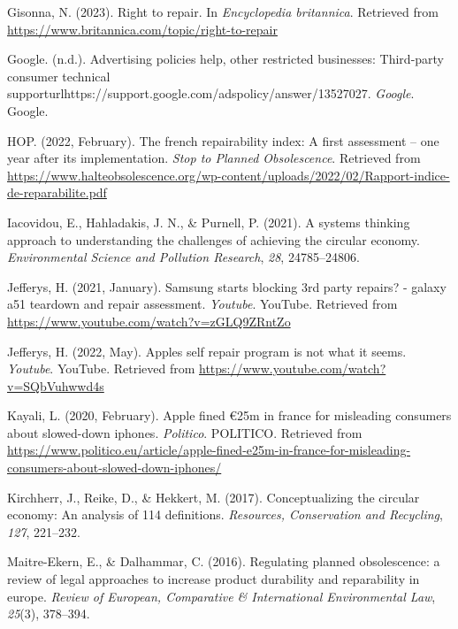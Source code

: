 \documentclass[11pt]{article}
\begin{document}
\begin{hangparas}{1.5em}{1}
\hypertarget{citeproc_bib_item_9}{Gisonna, N. (2023). Right to repair. In \textit{Encyclopedia britannica}. Retrieved from \url{https://www.britannica.com/topic/right-to-repair}}

\hypertarget{citeproc_bib_item_10}{Google. (n.d.). Advertising policies help, other restricted businesses: Third-party consumer technical supporturlhttps://support.google.com/adspolicy/answer/13527027. \textit{Google}. Google.}

\hypertarget{citeproc_bib_item_11}{HOP. (2022, February). The french repairability index: A first assessment – one year after its implementation. \textit{Stop to Planned Obsolescence}. Retrieved from \url{https://www.halteobsolescence.org/wp-content/uploads/2022/02/Rapport-indice-de-reparabilite.pdf}}

\hypertarget{citeproc_bib_item_12}{Iacovidou, E., Hahladakis, J. N., \& Purnell, P. (2021). A systems thinking approach to understanding the challenges of achieving the circular economy. \textit{Environmental Science and Pollution Research}, \textit{28}, 24785–24806.}

\hypertarget{citeproc_bib_item_13}{Jefferys, H. (2021, January). Samsung starts blocking 3rd party repairs? - galaxy a51 teardown and repair assessment. \textit{Youtube}. YouTube. Retrieved from \url{https://www.youtube.com/watch?v=zGLQ9ZRntZo}}

\hypertarget{citeproc_bib_item_14}{Jefferys, H. (2022, May). Apples self repair program is not what it seems. \textit{Youtube}. YouTube. Retrieved from \url{https://www.youtube.com/watch?v=SQbVuhwwd4s}}

\hypertarget{citeproc_bib_item_15}{Kayali, L. (2020, February). Apple fined €25m in france for misleading consumers about slowed-down iphones. \textit{Politico}. POLITICO. Retrieved from \url{https://www.politico.eu/article/apple-fined-e25m-in-france-for-misleading-consumers-about-slowed-down-iphones/}}

\hypertarget{citeproc_bib_item_16}{Kirchherr, J., Reike, D., \& Hekkert, M. (2017). Conceptualizing the circular economy: An analysis of 114 definitions. \textit{Resources, Conservation and Recycling}, \textit{127}, 221–232.}

\hypertarget{citeproc_bib_item_17}{Maitre-Ekern, E., \& Dalhammar, C. (2016). Regulating planned obsolescence: a review of legal approaches to increase product durability and reparability in europe. \textit{Review of European, Comparative \& International Environmental Law}, \textit{25}(3), 378–394.}


\end{hangparas}
\end{document}

